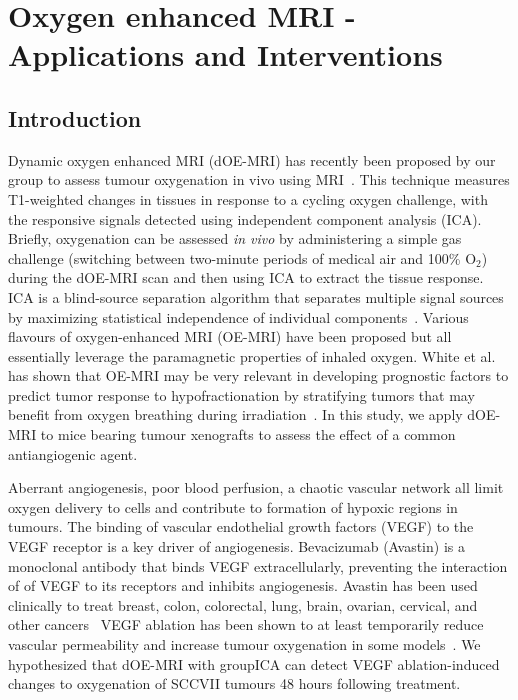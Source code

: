 
\chapter{Oxygen enhanced MRI - Applications and Interventions}
\label{ch:oemri3}

\section{Introduction}

Dynamic oxygen enhanced MRI (dOE-MRI) has recently been proposed by our group to assess tumour oxygenation in vivo using MRI~\cite{Moosvi:2018ca}. 
This technique measures T1-weighted changes in tissues in response to a cycling oxygen challenge, with the responsive signals detected using independent component analysis (ICA). 
Briefly, oxygenation can be assessed \emph{in vivo} by administering a simple gas challenge (switching between two-minute periods of medical air and 100\% O$_2$) during the dOE-MRI scan and then using ICA to extract the tissue response.
ICA is a blind-source separation algorithm that separates multiple signal sources by maximizing statistical independence of individual components~\cite{Hyvarinen:2000vk}.
Various flavours of oxygen-enhanced MRI (OE-MRI) have been proposed but all essentially leverage the paramagnetic properties of inhaled oxygen.
White et al. has shown that OE-MRI may be very relevant in developing prognostic factors to predict tumor response to hypofractionation by stratifying tumors that may benefit from oxygen breathing during irradiation~\cite{White:2016fz}.
In this study, we apply dOE-MRI to mice bearing tumour xenografts to assess the effect of a common antiangiogenic agent.

Aberrant angiogenesis, poor blood perfusion, a chaotic vascular network all limit oxygen delivery to cells and contribute to formation of hypoxic regions in tumours.
The binding of vascular endothelial growth factors (VEGF) to the VEGF receptor is a key driver of angiogenesis.
Bevacizumab (Avastin) is a monoclonal antibody that binds VEGF extracellularly, preventing the interaction of of VEGF to its receptors and inhibits angiogenesis. 
Avastin has been used clinically to treat breast, colon, colorectal, lung, brain, ovarian, cervical, and other cancers~\cite{AvastinIndications}%
VEGF ablation has been shown to at least temporarily reduce vascular permeability and increase tumour oxygenation in some models~\cite{OConnor:2012iea}. 
We hypothesized that dOE-MRI with groupICA can detect VEGF ablation-induced changes to oxygenation of SCCVII tumours 48 hours following treatment.


